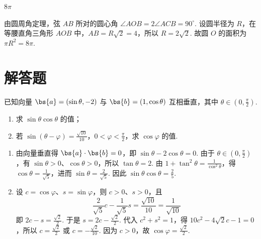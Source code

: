 \begin{answer}
\(8\pi\)
\end{answer}

\begin{solution}
由圆周角定理，弦 \(AB\) 所对的圆心角 \(\angle AOB=2\angle ACB=90^{\circ}\). 设圆半径为 \(R\)，在等腰直角三角形 \(AOB\) 中，\(AB=R\sqrt2=4\)，所以 \(R=2\sqrt2\). 故圆 \(O\) 的面积为 \(\pi R^2=8\pi\).
\end{solution}

\section{解答题}

\begin{problem}
已知向量 \(\bs{a} = (\sin \theta, -2)\) 与 \(\bs{b} = (1, \cos \theta)\) 互相垂直，其中 \(\theta \in \left(0, \frac{\pi}{2}\right)\).
\begin{enumerate}
\item 求 \(\sin\theta\cos\theta\) 的值；
\item 若 \(\sin(\theta-\varphi)=\frac{\sqrt{10}}{10}\)，\(0<\varphi<\frac{\pi}{2}\)，求 \(\cos\varphi\) 的值.
\end{enumerate}
\end{problem}

\begin{solution}
\begin{enumerate}
\item 由向量垂直得 \(\bs{a}\cdot\bs{b}=0\)，即 \(\sin\theta-2\cos\theta=0\). 由于 \(\theta\in(0,\frac\pi2)\)，有 \(\sin\theta>0\)、\(\cos\theta>0\)，所以 \(\tan\theta=2\). 由 \(1+\tan^2\theta=\frac1{\cos^2\theta}\)，得 \(\cos\theta=\frac1{\sqrt5}\)，进而 \(\sin\theta=\frac2{\sqrt5}\). 因此 \(\sin\theta\cos\theta=\frac25\).
\item 设 \(c=\cos\varphi\)、\(s=\sin\varphi\)，则 \(c>0\)、\(s>0\)，且
\[
\frac2{\sqrt5}c-\frac1{\sqrt5}s=\frac{\sqrt{10}}{10}=\frac1{\sqrt{10}}
\]
即 \(2c-s=\frac{\sqrt2}{2}\). 于是 \(s=2c-\frac{\sqrt2}{2}\). 代入 \(c^2+s^2=1\)，得 \(10c^2-4\sqrt2c-1=0\)，所以 \(c=\frac{\sqrt2}{2}\) 或 \(c=-\frac{\sqrt2}{10}\). 因为 \(c>0\)，故 \(\cos\varphi=\frac{\sqrt2}{2}\).
\end{enumerate}
\end{solution}


